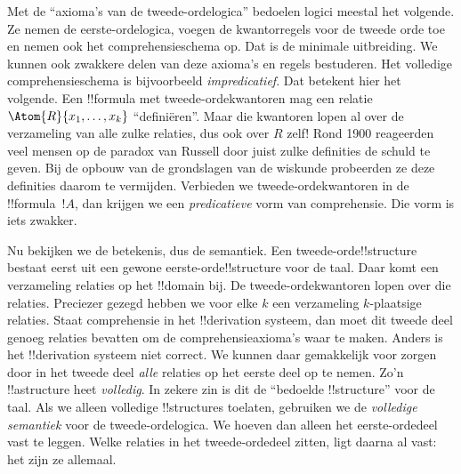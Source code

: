 \documentclass[openany]{memoir}
\begin{document}
Met de ``axioma's van de tweede-ordelogica'' bedoelen logici meestal het
volgende. Ze nemen de eerste-ordelogica, voegen de kwantorregels voor de
tweede orde toe en nemen ook het comprehensieschema op. Dat is de minimale
uitbreiding. We kunnen ook zwakkere delen van deze axioma's en regels
bestuderen. Het volledige comprehensieschema is bijvoorbeeld
\emph{impredicatief}. Dat betekent hier het volgende. Een !!{formula} met
tweede-ordekwantoren mag een relatie $\Atom{R}{x_1, \dots, x_k}$
``definiëren''. Maar die kwantoren lopen al over de verzameling van alle
zulke relaties, dus ook over $R$ zelf!{} Rond 1900 reageerden veel mensen op
de paradox van Russell door juist zulke definities de schuld te geven. Bij de
opbouw van de grondslagen van de wiskunde probeerden ze deze definities daarom
te vermijden. Verbieden we tweede-ordekwantoren in de !!{formula}~$!A$, dan
krijgen we een {\em predicatieve} vorm van comprehensie. Die vorm is iets
zwakker.

Nu bekijken we de betekenis, dus de semantiek. Een tweede-orde!!{structure}
bestaat eerst uit een gewone eerste-orde!!{structure} voor de taal. Daar komt
een verzameling relaties op het !!{domain} bij. De tweede-ordekwantoren lopen
over die relaties. Preciezer gezegd hebben we voor elke $k$ een verzameling
$k$-plaatsige relaties. Staat comprehensie in het !!{derivation} systeem, dan
moet dit tweede deel genoeg relaties bevatten om de comprehensieaxioma's waar
te maken. Anders is het !!{derivation} systeem niet correct. We kunnen daar
gemakkelijk voor zorgen door in het tweede deel \emph{alle} relaties op het
eerste deel op te nemen. Zo'n !!a{structure} heet \emph{volledig}. In zekere
zin is dit de ``bedoelde !!{structure}'' voor de taal. Als we alleen volledige
!!{structure}s toelaten, gebruiken we de \emph{volledige semantiek} voor de
tweede-ordelogica. We hoeven dan alleen het eerste-ordedeel vast te leggen.
Welke relaties in het tweede-ordedeel zitten, ligt daarna al vast: het zijn ze
allemaal.
\end{document}
